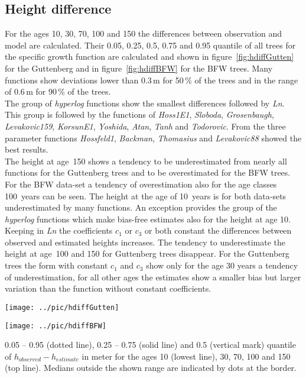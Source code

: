 \documentclass[a4paper,twocolumn]{article}
\begin{document}

\subsection{Height difference}

For the ages 10, 30, 70, 100 and 150 the differences between
observation and model are calculated. Their 0.05, 0.25, 0.5, 0.75 and
0.95 quantile of all trees for the specific growth function are
calculated and shown in figure~\ref{fig:hdiffGutten} for the
Guttenberg and in figure~\ref{fig:hdiffBFW} for the BFW trees. Many
functions show deviations lower than 0.3\,m for 50\,\% of the trees
and in the range of 0.6\,m for 90\,\% of the trees.\\
%
The group of \emph{hyperlog} functions show the smallest differences
followed by \emph{Ln}. This group is followed by the functions of
\emph{Hoss1E1}, \emph{Sloboda}, \emph{Grosenbaugh},
\emph{Levakovic159}, \emph{KorsunE1}, \emph{Yoshida}, \emph{Atan},
\emph{Tanh} and \emph{Todorovic}. From the three parameter functions
\emph{Hossfeld1}, \emph{Backman}, \emph{Thomasius} and
\emph{Levakovic88} showed the best results.\\
%
The height at age~150 shows a tendency to be underestimated from
nearly all functions for the Guttenberg trees and to be overestimated
for the BFW
trees. For the BFW data-set a tendency of overestimation also for the
age classes 100~years can be seen. The height at the age of 10~years is for both
data-sets underestimated by many functions. An exception provides the
group of the \emph{hyperlog} functions which make bias-free estimates
also for the height at age 10.\\
%
Keeping in \emph{Ln} the coefficients $c_1$ or $c_3$ or both constant
the differences between observed and estimated heights increases. The
tendency to underestimate the height at age~100 and 150 for Guttenberg
trees disappear. For the Guttenberg trees the form with constant $c_1$
and $c_3$ show only for the age 30 years a tendency of
underestimation, for all other ages the estimates show a smaller bias
but larger variation than the function without constant coefficients.

\begin{figure*}[htbp]
  \begin{minipage}{.49\linewidth}
    \centering
    \texttt{[image: ../pic/hdiffGutten]}
    \caption{Height difference Guttenberg}
    \label{fig:hdiffGutten}
  \end{minipage}
  \begin{minipage}{.49\linewidth}
    \centering
    \texttt{[image: ../pic/hdiffBFW]}
    \caption{Height difference BFW}
    \label{fig:hdiffBFW}
  \end{minipage}
  \scriptsize{0.05 -- 0.95 (dotted line), 0.25 -- 0.75 (solid line)
    and 0.5 (vertical mark) quantile of $h_{observed} - h_{estimate}$ in meter
    for the ages 10 (lowest line), 30, 70, 100 and 150 (top
    line). Medians outside the shown range are indicated by dots at
    the border.}
\end{figure*}
\end{document}
